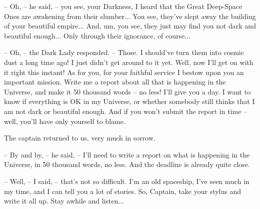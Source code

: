 \documentclass[ebook,twoside,final,openright]{memoir}
\begin{document}
– Oh, – he said, – you see, your Darkness, I heard that the Great Deep-Space Ones are awakening from their slumber... You see, they’ve slept away the building of your beautiful empire... And, um, you see, they just may find you not dark and beautiful enough... Only through their ignorance, of course...\par
– Oh, – the Dark Lady responded. – Those. I should’ve turn them into cosmic dust a long time ago! I just didn’t get around to it yet. Well, now I’ll get on with it right this instant! As for you, for your faithful service I bestow upon you an important mission. Write me a report about all that is happening in the Universe, and make it 50 thousand words – no less! I’ll give you a day. I want to know if everything is OK in my Universe, or whether somebody still thinks that I am not dark or beautiful enough. And if you won’t submit the report in time – well, you’ll have only yourself to blame.\par
\par
The captain returned to us, very much in sorrow.\par
– By and by, – he said, – I’ll need to write a report on what is happening in the Universe, in 50 thousand words, no less. And the deadline is already quite close.\par
– Well, – I said, – that’s not so difficult. I'm an old spaceship, I’ve seen much in my time, and I can tell you a lot of stories. So, Captain, take your stylus and write it all up. Stay awhile and listen...
\end{document}

